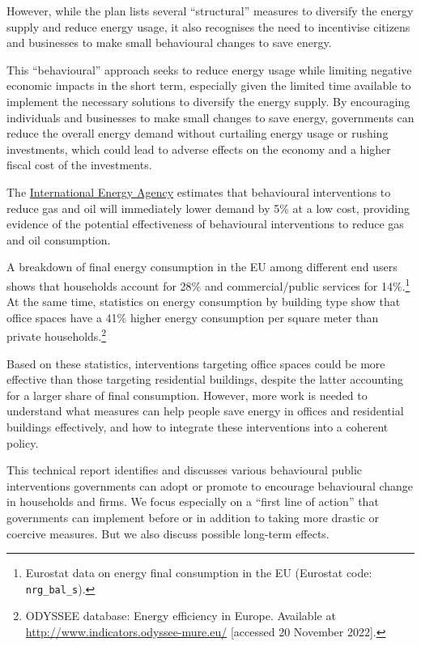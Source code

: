 \documentclass[
  11pt,
  captions=heading]{scrreport}
\begin{document}
However, while the plan lists several ``structural'' measures to
diversify the energy supply and reduce energy usage, it also recognises
the need to incentivise citizens and businesses to make small
behavioural changes to save energy.

This ``behavioural'' approach seeks to reduce energy usage while
limiting negative economic impacts in the short term, especially given
the limited time available to implement the necessary solutions to
diversify the energy supply. By encouraging individuals and businesses
to make small changes to save energy, governments can reduce the overall
energy demand without curtailing energy usage or rushing investments,
which could lead to adverse effects on the economy and a higher fiscal
cost of the investments.

The \href{www.iea.org}{International Energy Agency} estimates that
behavioural interventions to reduce gas and oil will immediately lower
demand by 5\% at a low cost, providing evidence of the potential
effectiveness of behavioural interventions to reduce gas and oil
consumption.

A breakdown of final energy consumption in the EU among different end
users shows that households account for 28\% and commercial/public
services for 14\%.\footnote{Eurostat data on energy final consumption in
  the EU (Eurostat code: \texttt{nrg\_bal\_s}).} At the same time,
statistics on energy consumption by building type show that office
spaces have a 41\% higher energy consumption per square meter than
private households.\footnote{ODYSSEE database: Energy efficiency in
  Europe. Available at
  \href{http://www.indicators.odyssee-mure.eu}{http://www.indicators.odyssee-mure.eu/}
  {[}accessed 20 November 2022{]}.}

Based on these statistics, interventions targeting office spaces could
be more effective than those targeting residential buildings, despite
the latter accounting for a larger share of final consumption. However,
more work is needed to understand what measures can help people save
energy in offices and residential buildings effectively, and how to
integrate these interventions into a coherent policy.

This technical report identifies and discusses various behavioural
public interventions governments can adopt or promote to encourage
behavioural change in households and firms. We focus especially on a
``first line of action'' that governments can implement before or in
addition to taking more drastic or coercive measures. But we also
discuss possible long-term effects.
\end{document}
